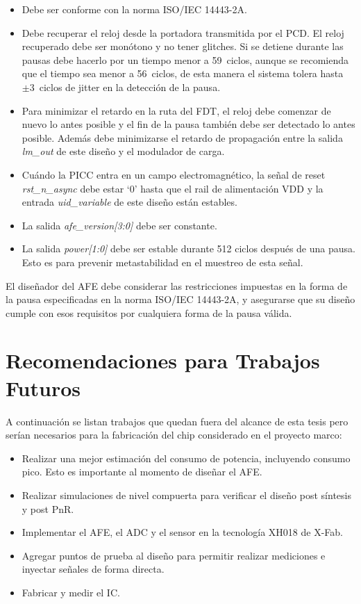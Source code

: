 \documentclass[a4paper, twoside, 11pt]{report}
\begin{document}
\begin{itemize}
  \item Debe ser conforme con la norma ISO/IEC 14443-2A.
  \item Debe recuperar el reloj desde la portadora transmitida por el PCD. El reloj recuperado debe ser monótono y no tener glitches. Si se detiene durante las pausas debe hacerlo por un tiempo menor a 59~ciclos, aunque se recomienda que el tiempo sea menor a 56~ciclos, de esta manera el sistema tolera hasta $\pm 3$~ciclos de jitter en la detección de la pausa.
  \item Para minimizar el retardo en la ruta del FDT, el reloj debe comenzar de nuevo lo antes posible y el fin de la pausa también debe ser detectado lo antes posible. Además debe minimizarse el retardo de propagación entre la salida \textit{lm\_out} de este diseño y el modulador de carga.
  \item Cuándo la PICC entra en un campo electromagnético, la señal de reset \textit{rst\_n\_async} debe estar ‘0’ hasta que el rail de alimentación VDD y la entrada \textit{uid\_variable} de este diseño están estables.
  \item La salida \textit{afe\_version[3:0]} debe ser constante.
  \item La salida \textit{power[1:0]} debe ser estable durante 512 ciclos después de una pausa. Esto es para prevenir metastabilidad en el muestreo de esta señal.
\end{itemize}

El diseñador del AFE debe considerar las restricciones impuestas en la forma de la pausa especificadas en la norma ISO/IEC 14443-2A, y asegurarse que su diseño cumple con esos requisitos por cualquiera forma de la pausa válida.

\FloatBarrier
\section{Recomendaciones para Trabajos Futuros}

A continuación se listan trabajos que quedan fuera del alcance de esta tesis pero serían necesarios para la fabricación del chip considerado en el proyecto marco:

\begin{itemize}
  \item Realizar una mejor estimación del consumo de potencia, incluyendo consumo pico. Esto es importante al momento de diseñar el AFE.
  \item Realizar simulaciones de nivel compuerta para verificar el diseño post síntesis y post PnR.
  \item Implementar el AFE, el ADC y el sensor en la tecnología XH018 de X-Fab.
  \item Agregar puntos de prueba al diseño para permitir realizar mediciones e inyectar señales de forma directa.
  \item Fabricar y medir el IC.
\end{itemize}
\end{document}
